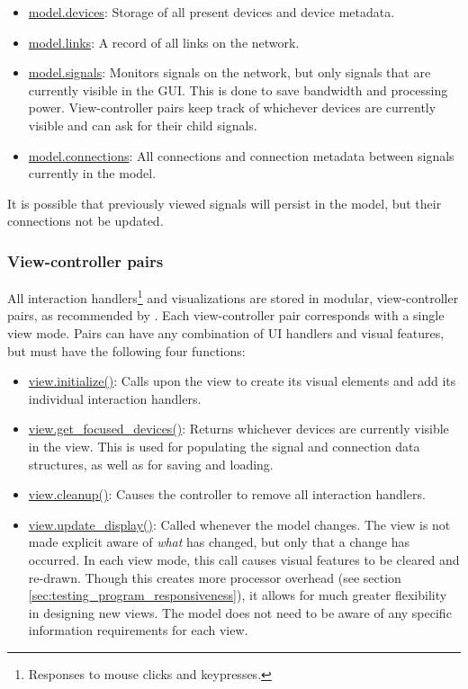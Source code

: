 \begin{itemize}
 	\item \url{model.devices}: Storage of all present devices and device metadata.
 	\item \url{model.links}: A record of all links on the network.
 	\item \url{model.signals}: Monitors signals on the network, but only signals that are currently visible in the GUI. This is done to save bandwidth and processing power. View-controller pairs keep track of whichever devices are currently visible and can ask for their child signals. 
 	\item \url{model.connections}: All connections and connection metadata between signals currently in the model.
 \end{itemize} 

It is possible that previously viewed signals will persist in the model, but their connections not be updated.

		\subsubsection{View-controller pairs}

All interaction handlers\footnote{Responses to mouse clicks and keypresses.} and visualizations are stored in modular, view-controller pairs, as recommended by . Each view-controller pair corresponds with a single view mode. Pairs can have any combination of UI handlers and visual features, but must have the following four functions:

\begin{itemize}
	\item \url{view.initialize()}: Calls upon the view to create its visual elements and add its individual interaction handlers.
	\item \url{view.get_focused_devices()}: Returns whichever devices are currently visible in the view. This is used for populating the signal and connection data structures, as well as for saving and loading.
	\item \url{view.cleanup()}: Causes the controller to remove all interaction handlers.
	\item \url{view.update_display()}: Called whenever the model changes. The view is not made explicit aware of \emph{what} has changed, but only that a change has occurred. In each view mode, this call causes visual features to be cleared and re-drawn. Though this creates more processor overhead (see section \ref{sec:testing_program_responsiveness}), it allows for much greater flexibility in designing new views. The model does not need to be aware of any specific information requirements for each view.
\end{itemize}

